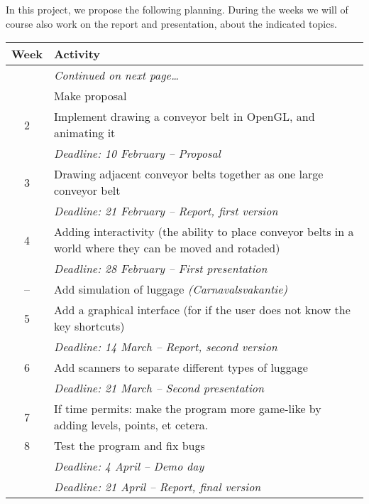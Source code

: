 In this project, we propose the following planning. During the weeks we will of course also work on the report and presentation, about the indicated topics.

\begin{longtabu} to 0.99
 \toprule
 \textbf{Week} & \textbf{Activity} \\
 \midrule
 \endhead
 \bottomrule
 & \vspace*{-5pt}\hfill\textit{Continued on next page\ldots} \\
 \endfoot
 \bottomrule
  & Make proposal \\
 2 & Implement drawing a conveyor belt in OpenGL, and animating it \\
   & \textit{Deadline: 10 February -- Proposal} \\
 3 & Drawing adjacent conveyor belts together as one large conveyor belt \\
   & \textit{Deadline: 21 February -- Report, first version} \\
 4 & Adding interactivity (the ability to place conveyor belts in a world where they can be moved and rotaded) \\
   & \textit{Deadline: 28 February -- First presentation} \\
-- & Add simulation of luggage \textit{(Carnavalsvakantie)} \\
 5 & Add a graphical interface (for if the user does not know the key shortcuts) \\
   & \textit{Deadline: 14 March -- Report, second version} \\
 6 & Add scanners to separate different types of luggage \\
   & \textit{Deadline: 21 March -- Second presentation} \\
 7 & If time permits: make the program more game-like by adding levels, points, et cetera. \\
 8 & Test the program and fix bugs \\
   & \textit{Deadline: 4 April -- Demo day} \\
   & \textit{Deadline: 21 April -- Report, final version} \\
\end{longtabu}

